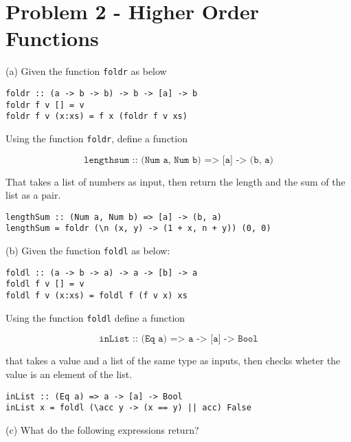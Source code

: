 \documentclass{article}
\begin{document}
    \section{Problem 2 - Higher Order Functions}

    (a) Given the function \texttt{foldr} as below

    \begin{lstlisting}
foldr :: (a -> b -> b) -> b -> [a] -> b 
foldr f v [] = v
foldr f v (x:xs) = f x (foldr f v xs)
    \end{lstlisting}

    Using the function \texttt{foldr}, define a function

    \[ \texttt{lengthsum :: (Num a, Num b) => [a] -> (b, a)} \]

    That takes a list of numbers as input, then return the length and the sum of the list as a pair.

    \begin{ans}
    \hspace{1em}
     \begin{lstlisting}
lengthSum :: (Num a, Num b) => [a] -> (b, a)
lengthSum = foldr (\n (x, y) -> (1 + x, n + y)) (0, 0)
     \end{lstlisting}  
    \end{ans}

    (b) Given the function \texttt{foldl} as below:
            
    \begin{lstlisting}
foldl :: (a -> b -> a) -> a -> [b] -> a 
foldl f v [] = v
foldl f v (x:xs) = foldl f (f v x) xs
    \end{lstlisting}

    Using the function \texttt{foldl} define a function

    \[ \texttt{inList :: (Eq a) => a -> [a] -> Bool} \]

    that takes a value and a list of the same type as inputs, then checks wheter the value is an element of the list.

    \begin{ans}
        \hspace{1em}
        \begin{lstlisting}
inList :: (Eq a) => a -> [a] -> Bool
inList x = foldl (\acc y -> (x == y) || acc) False
        \end{lstlisting}
    \end{ans}


    (c) What do the following expressions return?
    \medskip
\end{document}
